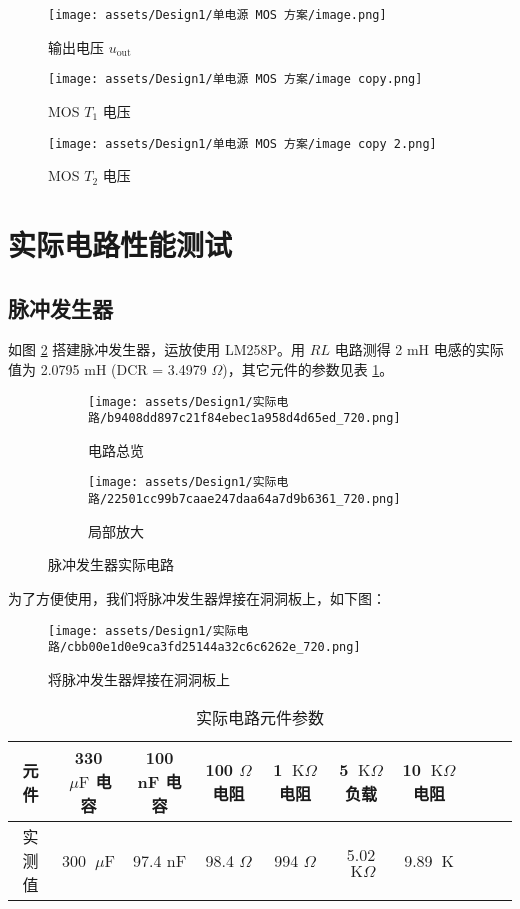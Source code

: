 \documentclass[UTF8]{article}
\def\K{\ \mathrm{K}}
\def\kO{\ \mathrm{K}\Omega}
\def\uF{\ \mu\mathrm{F}}
\def\K{\ \mathrm{K}}
\def\kO{\ \mathrm{K}\Omega}
\def\uF{\ \mu\mathrm{F}}
\theoremstyle{MyLineTheoremStyle} %
\theoremstyle{MyBlockTheoremStyle} %
\theoremstyle{MySubsubsectionStyle} %
\begin{document}
\begin{figure}[H]\centering
    \texttt{[image: assets/Design1/单电源 MOS 方案/image.png]}
    \caption{输出电压 $u_\text{out}$}
    \label{输出电压 3}
\end{figure}
\begin{figure}[H]\centering
    \texttt{[image: assets/Design1/单电源 MOS 方案/image copy.png]}
    \caption{MOS $T_1$ 电压}
\end{figure}
\begin{figure}[H]\centering
    \texttt{[image: assets/Design1/单电源 MOS 方案/image copy 2.png]}
    \caption{MOS $T_2$ 电压}
\end{figure}



\section{实际电路性能测试}

\subsection{脉冲发生器}

如图 \ref{脉冲发生器实际电路} 搭建脉冲发生器，运放使用 LM258P。用 $RL$ 电路测得 2 mH 电感的实际值为 2.0795 mH (DCR = 3.4979 $\Omega$)，其它元件的参数见表 \ref{实际电路元件参数}。
\begin{figure}[H]\centering
\begin{subfigure}[b]{0.5\columnwidth}\centering
    \texttt{[image: assets/Design1/实际电路/b9408dd897c21f84ebec1a958d4d65ed\_720.png]}
    \caption{电路总览}
\end{subfigure}\hfill
\begin{subfigure}[b]{0.5\columnwidth}\centering
    \texttt{[image: assets/Design1/实际电路/22501cc99b7caae247daa64a7d9b6361\_720.png]}
    \caption{局部放大}
\end{subfigure}
\caption{脉冲发生器实际电路}
\label{脉冲发生器实际电路}
\end{figure}
为了方便使用，我们将脉冲发生器焊接在洞洞板上，如下图：
\begin{figure}[H]\centering
    \texttt{[image: assets/Design1/实际电路/cbb00e1d0e9ca3fd25144a32c6c6262e\_720.png]}
    \caption{将脉冲发生器焊接在洞洞板上}
    \label{将脉冲发生器焊接在洞洞板上}
\end{figure}

\begin{table}[H]\centering
    \caption{实际电路元件参数}
    \label{实际电路元件参数}
    \begin{tabular}{cccccccccc}\toprule
        元件 & 330 $\uF$ 电容 & 100 nF 电容 & 100 $\Omega$ 电阻 & 1 $\kO$ 电阻 & 5 $\kO$ 负载 & 10 $\kO$ 电阻\\
        \midrule
        实测值 & 300 $\uF$ & 97.4 nF & 98.4 $\Omega$ & 994 $\Omega$ & 5.02 $\kO$ & 9.89 $\K$ \\
        \bottomrule
    \end{tabular}
\end{table}
\end{document}
